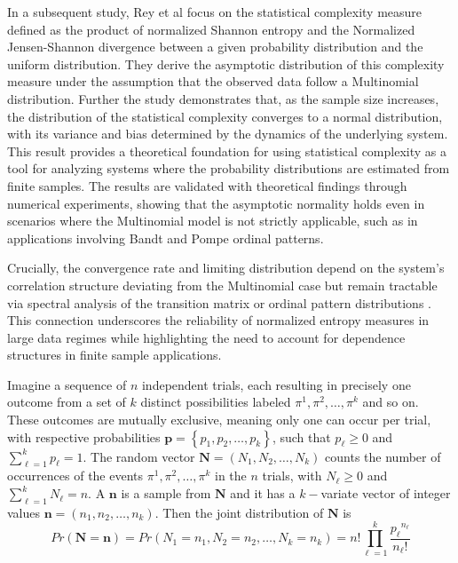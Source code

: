 In a subsequent study, Rey et al \cite{Rey2025} focus on the statistical complexity measure defined as the product of normalized Shannon entropy and the Normalized Jensen-Shannon divergence between a given probability distribution and the uniform distribution. 
They derive the asymptotic distribution of this complexity measure under the assumption that the observed data follow a Multinomial distribution. Further the study demonstrates that, as the sample size increases, the distribution of the statistical complexity converges to a normal distribution, with its variance and bias determined by the dynamics of the underlying system. This result provides a theoretical foundation for using statistical complexity as a tool for analyzing systems where the probability distributions are estimated from finite samples. The results are validated with theoretical findings through numerical experiments, showing that the asymptotic normality holds even in scenarios where the Multinomial model is not strictly applicable, such as in applications involving Bandt and Pompe ordinal patterns. 

Crucially, the convergence rate and limiting distribution depend on the system’s correlation structure deviating from the Multinomial case but remain tractable via spectral analysis of the transition matrix or ordinal pattern distributions \cite{Chagas2022,PhysRevE.103.022215}. This connection underscores the reliability of normalized entropy measures in large data regimes while highlighting the need to account for dependence structures in finite sample applications.


Imagine a sequence of $n$ independent trials, each resulting in precisely one outcome from a set of $k$ distinct possibilities labeled $\pi^1,\pi^2, \dots, \pi^k$ and so on. These outcomes are mutually exclusive, meaning only one can occur per trial, with respective probabilities $\bm{p}={\left\{p_1,p_2,\dots,p_k\right\}}$, such that $p_\ell \geq 0$ and $\sum^{k}_{\ell=1} {p_\ell =1}.$ The random vector $\bm{N}=(N_1,N_2,\dots, N_k)$ counts the number of occurrences of the events $\pi^1,\pi^2, \dots, \pi^k$ in the $n$ trials, with $N_\ell \geq0$ and $\sum^{k}_{\ell=1} {N_\ell =n}.$ A $\bm{n}$ is a sample from $\bm{N}$ and it has a $k-$variate vector of integer values $\bm{n}=(n_1,n_2,\dots,n_k).$ Then the joint distribution of $\bm{N}$ is 
\begin{equation}
	Pr(\bm{N=n})=Pr(N_1=n_1,N_2=n_2, \dots,N_k=n_k)=n!\prod_{\ell=1}^{k}\frac{{p_\ell}^{n_\ell}}{n_\ell !}
\end{equation}   

